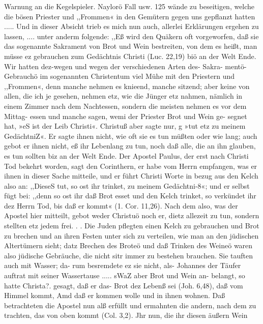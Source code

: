 Warnung an die Kegelspieler. Naylorö Fall usw. 125
wände zu beseitigen, welche die bösen Priester und ,,Frommen«
in den Gemütern gegen uns gepflanzt hatten ..... Und in
dieser Absicht trieb es mich nun auch, allerlei Erklärungen ergehen
zu lassen, .... unter anderm folgende: ,,Eß wird den Quäkern
oft vorgeworfen, daß sie das sogenannte Sakrament von Brot und
Wein bestreiten, von dem es heißt, man müsse ez gebrauchen zum
Gedächtnis Christi (Luc. 22,19) biö an der Welt Ende. Wir
hatten dez-wegen und wegen der verschiedenen Arten des- Sakra-
mentö-Gebrauchö im sogenannten Christentum viel Mühe mit den
Priestern und ,,Frommen«, denn manche nehmen es knieend,
manche sitzend; aber keine von allen, die ich je gesehen, nehmen
etz, wie die Jünger etz nahmen, nämlich in einem Zimmer nach
dem Nachtessen, sondern die meisten nehmen es vor dem Mittag-
essen und manche sagen, wemi der Priester Brot und Wein ge-
segnet hat, »eS ist der Leib Christi«. Christuß aber sagte nur, g
»tut etz zu meinem GedächtniZ«. Er sagte ihnen nicht, wie oft
sie es tun müßten oder wie lang; auch gebot er ihnen nicht, eß
ihr Lebenlang zu tun, noch daß alle, die an ihn glauben, es
tun sollten biz an der Welt Ende. Der Apostel Paulus, der erst
nach Christi Tod bekehrt worden, sagt den Corinthern, er habe vom
Herrn empfangen, was er ihnen in dieser Sache mitteile, und er
führt Christi Worte in bezug aus den Kelch also an: ,,DieseS
tut, so ost ihr trinket, zu meinem Gedächtni-8«; und er selbst fügt
bei: ,,denn so ost ihr daß Brot esset und den Kelch trinket, so
verkündet ihr dez Herrn Tod, bis daß er kommt« (1. Cor. 11,26).
Nach dem also, was der Apostel hier mitteilt, gebot weder Christuö
noch er, dietz allezeit zu tun, sondern stellten etz jedem frei. . .
Die Juden pflegten einen Kelch zu gebrauchen und Brot zu
brechen und an ihren Festen unter sich zu verteilen, wie man an
den jüdischen Altertümern sieht; datz Brechen des Broteö und daß
Trinken des Weineö waren also jüdische Gebräuche, die nicht sitr
immer zu bestehen brauchen. Sie tauften auch mit Wasser; da-
rum besremdete ez sie nicht, als- Johannes der Täufer auftrat
mit seiner Wassertause ..... sWaZ aber Brot und Wein an-
belangt, so hatte Christa?. gesagt, daß er das- Brot dez Lebenß
sei (Joh. 6,48), daß vom Himmel kommt, Amd daß er kommen
wolle und in ihnen wohnen. Daß betrachteten die Apostel nun
alß erfüllt und ermahnten die andern, nach dem zu trachten, das
von oben kommt (Col. 3,2). Jhr nun, die ihr diesen äußern Wein


